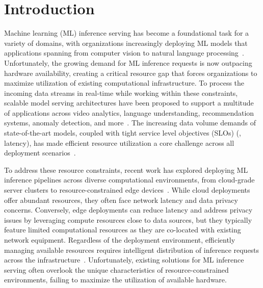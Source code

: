 \section{Introduction}\label{sec:intro}

Machine learning (ML) inference serving has become a foundational task for a
variety of domains, with organizations  increasingly deploying ML models that
applications spanning from computer vision to natural language
processing~\cite{}. Unfortunately, the growing demand for ML inference requests
is now outpacing hardware availability, creating a critical resource gap that
forces organizations to maximize utilization of existing computational
infrastructure. To process the incoming data streams in real-time while working
within these constraints, scalable model serving architectures have been
proposed to support a multitude of applications across video analytics, language
understanding, recommendation systems, anomaly detection, and more~\cite{}. The
increasing data volume demands of state-of-the-art models, coupled with tight
service level objectives (SLOs) (\eg, latency), has made efficient resource
utilization a core challenge across all deployment scenarios~\cite{}.

 To address these resource constraints, recent work has explored deploying ML
inference pipelines across diverse computational environments, from cloud-grade
server clusters to resource-constrained edge devices~\cite{}. While cloud
deployments offer abundant resources, they often face network latency and data
privacy concerns. Conversely, edge deployments can reduce latency and address
privacy issues by leveraging compute resources close to data sources, but they
typically feature limited computational resources as they are co-located with
existing network equipment. Regardless of the deployment environment,
efficiently managing available resources requires intelligent distribution of
inference requests across the infrastructure~\cite{}. Unfortunately, existing
solutions for ML inference serving often overlook the unique characteristics of
resource-constrained environments, failing to maximize the utilization of
available hardware.

